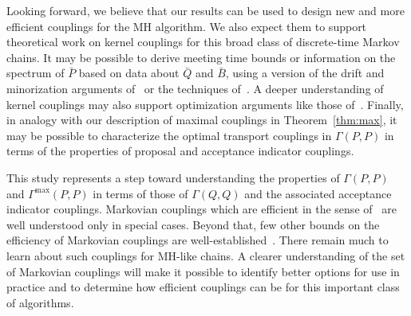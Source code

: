 \documentclass[aihp]{imsart}
\theoremstyle{plain}
\theoremstyle{remark}
\theoremstyle{definition} \newtheorem{example}{Example}
\newcommand{\bp}{\bar P}
\newcommand{\bq}{\bar Q}
\newcommand{\bb}{\bar B}
\newcommand{\Gmax}{\Gamma^\mathrm{max}}
\begin{document}
Looking forward, we believe that our results can be used to design new and more efficient couplings
for the MH algorithm. We also expect them to support theoretical work on kernel couplings for this
broad class of discrete-time Markov chains. It may be possible to derive meeting time bounds or
information on the spectrum of $\bp$ based on data about $\bq$ and $\bb$, using a version of  the
drift and minorization arguments of~\citet{rosenthal1995minorization, rosenthal2002quantitative} or
the techniques of~\citet{atchade2007geometric}. A deeper understanding of kernel couplings may also
support optimization arguments like those of~\citet{boyd2004fastest, boyd2006fastest,
	boyd2009fastest}. Finally, in analogy with our description of maximal couplings in
Theorem~\ref{thm:max}, it may be possible to characterize the optimal transport couplings in
$\Gamma(P,P)$ in terms of the properties of proposal and acceptance indicator couplings.

This study represents a step toward understanding the properties of $\Gamma(P,P)$ and $\Gmax(P,P)$
in terms of those of $\Gamma(Q,Q)$ and the associated acceptance indicator couplings. Markovian
couplings which are efficient in the sense of~\citet{aldous1983random} are well understood only in
special cases. Beyond that, few other bounds on the efficiency of Markovian couplings are
well-established~\citep{burdzy2000efficient}. There remain much to learn about such couplings for
MH-like chains. A clearer understanding of the set of Markovian couplings will make it possible to
identify better options for use in practice and to determine how efficient couplings can be for this
important class of algorithms.

\end{document}
